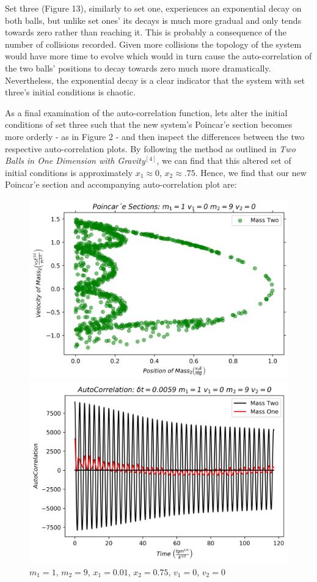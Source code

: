\documentclass[twocolumn]{article}
\begin{document}
\hspace{-3.8mm}Set three (Figure 13), similarly to set one, experiences an exponential decay on both balls, but unlike set ones' its decays is much more gradual and only tends towards zero rather than reaching it. This is probably a consequence of the number of collisions recorded. Given more collisions the topology of the system would have more time to evolve which would in turn cause the auto-correlation of the two balls' positions to decay towards zero much more dramatically. Nevertheless, the exponential decay is a clear indicator that the system with set three's initial conditions is chaotic. 

As a final examination of the auto-correlation function, lets alter the initial conditions of set three such that the new system's Poincar'e section becomes more orderly - as in Figure 2 - and then inspect the differences between the two respective auto-correlation plots. By following the method as outlined in \textit{Two Balls in One Dimension with Gravity}$^{[4]}$, we can find that this altered set of initial conditions is approximately $x_1\approx0$, $x_2\approx.75$. Hence, we find that our new Poincar'e section and accompanying auto-correlation plot are:
\begin{figure}[H]
\caption{$m_1=1$, $m_2=9$, $x_1=0.01$, $x_2=0.75$, $v_1=0$, $v_2=0$}
\centering
\includegraphics[scale=.45]{Section-MoreNormal}
\caption{$m_1=1$, $m_2=9$, $x_1=0.01$, $x_2=0.75$, $v_1=0$, $v_2=0$}
\centering
\includegraphics[scale=.45]{Correlation-MoreNormal}
\end{figure}
\end{document}

